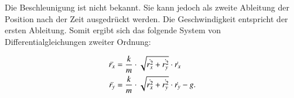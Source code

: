 Die Beschleunigung ist nicht bekannt.
%
Sie kann jedoch als zweite Ableitung der Position nach der Zeit ausgedrückt werden.
Die Geschwindigkeit entspricht der ersten Ableitung.
Somit ergibt sich das folgende System von Differentialgleichungen zweiter Ordnung:

\begin{equation}\label{eq:x_diff}
\begin{aligned}
\Ddot{r_x} &= \frac{k}{m} \cdot \sqrt{\dot{r_x^2} + \dot{r_y^2}} \cdot \dot{r_x}\\
\Ddot{r_y} &=   \frac{k}{m} \cdot \sqrt{\dot{r_x^2} + \dot{r_y^2}} \cdot \dot{r_y} - g.
\end{aligned}     
\end{equation}





